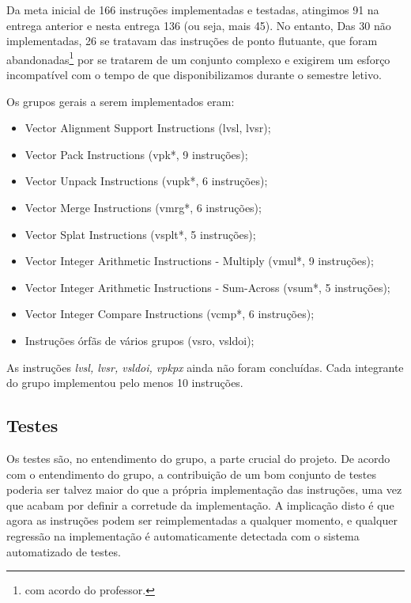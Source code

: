\documentclass{article}
\begin{document}
Da meta inicial de 166 instruções implementadas e testadas, atingimos
91 na entrega anterior e nesta entrega
136 (ou seja, mais 45). No entanto, Das 30 não implementadas,
26 se tratavam das
instruções de ponto flutuante, que foram abandonadas\footnote{com
acordo do professor.} por se tratarem
de um conjunto complexo e exigirem um esforço incompatível com o tempo
de que disponibilizamos durante o semestre letivo. 

Os grupos gerais a serem implementados eram:

\begin{itemize}


\item Vector Alignment Support Instructions (lvsl, lvsr); 
\item Vector Pack Instructions (vpk*, 9 instruções); 
\item Vector Unpack Instructions (vupk*, 6 instruções); 
\item Vector Merge Instructions (vmrg*, 6 instruções); 
\item Vector Splat Instructions (vsplt*, 5 instruções); 
\item Vector Integer Arithmetic Instructions - Multiply (vmul*, 9
instruções);
\item Vector Integer Arithmetic Instructions - Sum-Across (vsum*, 5
instruções);
\item Vector Integer Compare Instructions (vcmp*, 6 instruções); 
\item Instruções órfãs de vários grupos (vsro, vsldoi);
\end{itemize}

As instruções \emph{lvsl, lvsr, vsldoi, vpkpx} ainda não foram
concluídas. Cada integrante do grupo implementou pelo menos 10
instruções. 



\subsection{Testes}



Os testes são, no entendimento do grupo,  a parte crucial do projeto.
De acordo com o entendimento do grupo, a contribuição de um bom
conjunto de testes poderia ser talvez maior do que a própria
implementação das instruções, uma vez que acabam por definir a
corretude da implementação. A implicação disto é que agora as
instruções podem ser reimplementadas a qualquer momento, e qualquer
regressão na implementação é automaticamente detectada com o sistema
automatizado de testes. 
\end{document}

